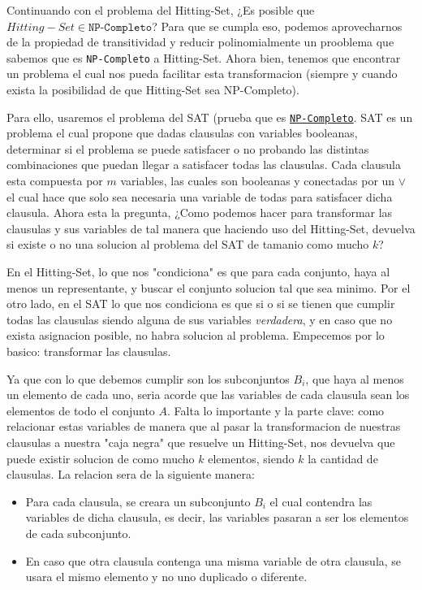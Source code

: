 Continuando con el problema del Hitting-Set, ¿Es posible que $Hitting-Set \in \texttt{NP-Completo}$?
Para que se cumpla eso, podemos aprovecharnos de la propiedad de transitividad y reducir polinomialmente un prooblema que sabemos que es \texttt{NP-Completo} a Hitting-Set. Ahora bien, tenemos que encontrar un problema el cual nos pueda facilitar esta transformacion (siempre y cuando exista la posibilidad de que Hitting-Set sea NP-Completo).

Para ello, usaremos el problema del SAT (prueba que es \href{https://www.geeksforgeeks.org/proof-that-sat-is-np-complete/}{\texttt{NP-Completo}}. SAT es un problema el cual propone que dadas clausulas con variables booleanas, determinar si el problema se puede satisfacer o no probando las distintas combinaciones que puedan llegar a satisfacer todas las clausulas. Cada clausula esta compuesta por $m$ variables, las cuales son booleanas y conectadas por un $\lor$ el cual hace que solo sea necesaria una variable de todas para satisfacer dicha clausula. Ahora esta la pregunta, ¿Como podemos hacer para transformar las clausulas y sus variables de tal manera que haciendo uso del Hitting-Set, devuelva si existe o no una solucion al problema del SAT de tamanio como mucho $k$? 

En el Hitting-Set, lo que nos "condiciona" es que para cada conjunto, haya al menos un representante, y buscar el conjunto solucion tal que sea minimo. Por el otro lado, en el SAT lo que nos condiciona es que si o si se tienen que cumplir todas las clausulas siendo alguna de sus variables \textit{verdadera}, y en caso que no exista asignacion posible, no habra solucion al problema. Empecemos por lo basico: transformar las clausulas.

Ya que con lo que debemos cumplir son los subconjuntos $B_i$, que haya al menos un elemento de cada uno, seria acorde que las variables de cada clausula sean los elementos de todo el conjunto $A$. Falta lo importante y la parte clave: como relacionar estas variables de manera que al pasar la transformacion de nuestras clausulas a nuestra "caja negra" que resuelve un Hitting-Set, nos devuelva que puede existir solucion de como mucho $k$ elementos, siendo $k$ la cantidad de clausulas. La relacion sera de la siguiente manera:
\begin{itemize}
    \item Para cada clausula, se creara un subconjunto $B_i$ el cual contendra las variables de dicha clausula, es decir, las variables pasaran a ser los elementos de cada subconjunto.
    \item En caso que otra clausula contenga una misma variable de otra clausula, se usara el mismo elemento y no uno duplicado o diferente.
\end{itemize}

